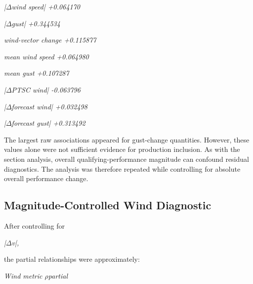 \begin{center}\textit{|\ensuremath{\Delta}wind speed|           +0.064170}\end{center}

\begin{center}\textit{|\ensuremath{\Delta}gust|                 +0.344534}\end{center}

\begin{center}\textit{wind-vector change      +0.115877}\end{center}

\begin{center}\textit{mean wind speed         +0.064980}\end{center}

\begin{center}\textit{mean gust               +0.107287}\end{center}

\begin{center}\textit{|\ensuremath{\Delta}PTSC wind|            -0.063796}\end{center}

\begin{center}\textit{|\ensuremath{\Delta}forecast wind|        +0.032498}\end{center}

\begin{center}\textit{|\ensuremath{\Delta}forecast gust|        +0.313492}\end{center}

The largest raw associations appeared for gust-change quantities. However, these values alone were not sufficient evidence for production inclusion. As with the section analysis, overall qualifying-performance magnitude can confound residual diagnostics. The analysis was therefore repeated while controlling for absolute overall performance change.

\subsection{Magnitude-Controlled Wind Diagnostic}
After controlling for

\begin{center}\textit{|\ensuremath{\Delta}v|,}\end{center}

the partial relationships were approximately:

\begin{center}\textit{Wind metric                \ensuremath{\rho}partial}\end{center}

